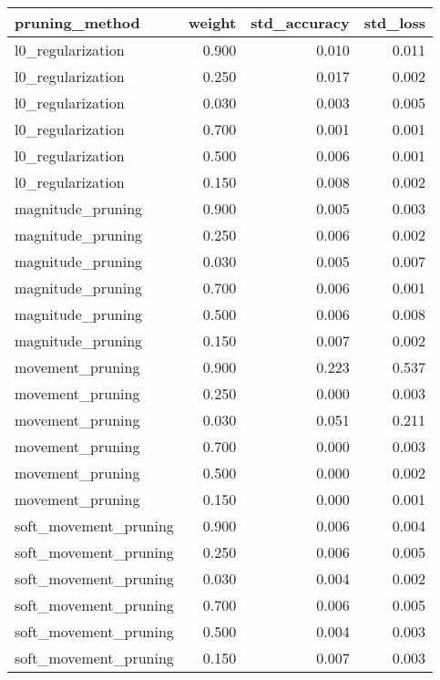 \begin{tabular}{lrrr}
\toprule
       pruning\_method &  weight &  std\_accuracy &  std\_loss \\
\midrule
    l0\_regularization &   0.900 &         0.010 &     0.011 \\
    l0\_regularization &   0.250 &         0.017 &     0.002 \\
    l0\_regularization &   0.030 &         0.003 &     0.005 \\
    l0\_regularization &   0.700 &         0.001 &     0.001 \\
    l0\_regularization &   0.500 &         0.006 &     0.001 \\
    l0\_regularization &   0.150 &         0.008 &     0.002 \\
    magnitude\_pruning &   0.900 &         0.005 &     0.003 \\
    magnitude\_pruning &   0.250 &         0.006 &     0.002 \\
    magnitude\_pruning &   0.030 &         0.005 &     0.007 \\
    magnitude\_pruning &   0.700 &         0.006 &     0.001 \\
    magnitude\_pruning &   0.500 &         0.006 &     0.008 \\
    magnitude\_pruning &   0.150 &         0.007 &     0.002 \\
     movement\_pruning &   0.900 &         0.223 &     0.537 \\
     movement\_pruning &   0.250 &         0.000 &     0.003 \\
     movement\_pruning &   0.030 &         0.051 &     0.211 \\
     movement\_pruning &   0.700 &         0.000 &     0.003 \\
     movement\_pruning &   0.500 &         0.000 &     0.002 \\
     movement\_pruning &   0.150 &         0.000 &     0.001 \\
soft\_movement\_pruning &   0.900 &         0.006 &     0.004 \\
soft\_movement\_pruning &   0.250 &         0.006 &     0.005 \\
soft\_movement\_pruning &   0.030 &         0.004 &     0.002 \\
soft\_movement\_pruning &   0.700 &         0.006 &     0.005 \\
soft\_movement\_pruning &   0.500 &         0.004 &     0.003 \\
soft\_movement\_pruning &   0.150 &         0.007 &     0.003 \\
\bottomrule
\end{tabular}
